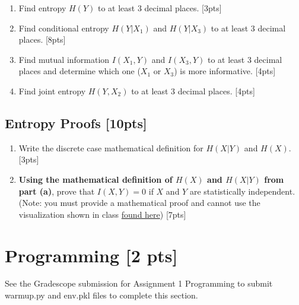 \documentclass{article}
\begin{document}
\begin{enumerate}[label=(\alph*)]
    \item Find entropy $H(Y)$ to at least 3 decimal places. [3pts]
    \item Find conditional entropy $H(Y|X_1)$ and $H(Y|X_3)$ to at least 3 decimal places. [8pts]
    \item Find mutual information $I(X_1, Y)$ and $I(X_3, Y)$ to at least 3 decimal places and determine which one ($X_1$ or $X_3$) is more informative. [4pts]
    \item Find joint entropy $H(Y, X_2)$ to at least 3 decimal places. [4pts]
\end{enumerate}


\subsection{Entropy Proofs [10pts]}

\begin{enumerate}[label=(\alph*)]
    \item Write the discrete case mathematical definition for $H(X|Y)$ and $H(X)$. [3pts]
    \item \textbf{Using the mathematical definition of $H(X)$ and $H(X|Y)$ from part (a)}, prove that $I(X,Y) = 0$ if $X$ and $Y$ are statistically independent. (Note: you must provide a mathematical proof and cannot use the visualization shown in class \href{https://mahdi-roozbahani.github.io/CS46417641-summer2022/other/CEandMI_Illustration.jpg}{found here}) [7pts] \\
    \newline
\end{enumerate}


\newpage

\section{Programming [2 pts]}
See the Gradescope submission for Assignment 1 Programming to submit warmup.py and env.pkl files to complete this section.
\end{document}
